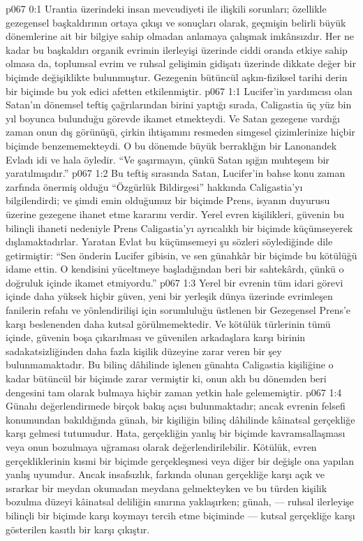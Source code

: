 \vs p067 0:1 Urantia üzerindeki insan mevcudiyeti ile ilişkili sorunları; özellikle gezegensel başkaldırının ortaya çıkışı ve sonuçları olarak, geçmişin belirli büyük dönemlerine ait bir bilgiye sahip olmadan anlamaya çalışmak imkânsızdır. Her ne kadar bu başkaldırı organik evrimin ilerleyişi üzerinde ciddi oranda etkiye sahip olmasa da, toplumsal evrim ve ruhsal gelişimin gidişatı üzerinde dikkate değer bir biçimde değişiklikte bulunmuştur. Gezegenin bütüncül aşkın\hyp{}fiziksel tarihi derin bir biçimde bu yok edici afetten etkilenmiştir.
\vs p067 1:1 Lucifer’in yardımcısı olan Satan’ın dönemsel teftiş çağrılarından birini yaptığı sırada, Caligastia üç yüz bin yıl boyunca bulunduğu görevde ikamet etmekteydi. Ve Satan gezegene vardığı zaman onun dış görünüşü, çirkin ihtişamını resmeden simgesel çizimlerinize hiçbir biçimde benzememekteydi. O bu dönemde büyük berraklığın bir Lanonandek Evladı idi ve hala öyledir. “Ve şaşırmayın, çünkü Satan ışığın muhteşem bir yaratılmışıdır.”
\vs p067 1:2 Bu teftiş sırasında Satan, Lucifer’in bahse konu zaman zarfında önermiş olduğu “Özgürlük Bildirgesi” hakkında Caligastia’yı bilgilendirdi; ve şimdi emin olduğumuz bir biçimde Prens, isyanın duyurusu üzerine gezegene ihanet etme kararını verdir. Yerel evren kişilikleri, güvenin bu bilinçli ihaneti nedeniyle Prens Caligastia’yı ayrıcalıklı bir biçimde küçümseyerek dışlamaktadırlar. Yaratan Evlat bu küçümsemeyi şu sözleri söylediğinde dile getirmiştir: “Sen önderin Lucifer gibisin, ve sen günahkâr bir biçimde bu kötülüğü idame ettin. O kendisini yüceltmeye başladığından beri bir sahtekârdı, çünkü o doğruluk içinde ikamet etmiyordu.”
\vs p067 1:3 Yerel bir evrenin tüm idari görevi içinde daha yüksek hiçbir güven, yeni bir yerleşik dünya üzerinde evrimleşen fanilerin refahı ve yönlendirilişi için sorumluluğu üstlenen bir Gezegensel Prens’e karşı beslenenden daha kutsal görülmemektedir. Ve kötülük türlerinin tümü içinde, güvenin boşa çıkarılması ve güvenilen arkadaşlara karşı birinin sadakatsizliğinden daha fazla kişilik düzeyine zarar veren bir şey bulunmamaktadır. Bu bilinç dâhilinde işlenen günahta Caligastia kişiliğine o kadar bütüncül bir biçimde zarar vermiştir ki, onun aklı bu dönemden beri dengesini tam olarak bulmaya hiçbir zaman yetkin hale gelememiştir.
\vs p067 1:4 Günahı değerlendirmede birçok bakış açısı bulunmaktadır; ancak evrenin felsefi konumundan bakıldığında günah, bir kişiliğin bilinç dâhilinde kâinatsal gerçekliğe karşı gelmesi tutumudur. Hata, gerçekliğin yanlış bir biçimde kavramsallaşması veya onun bozulmaya uğraması olarak değerlendirilebilir. Kötülük, evren gerçekliklerinin kısmi bir biçimde gerçekleşmesi veya diğer bir değişle ona yapılan yanlış uyumdur. Ancak insafsızlık, farkında olunan gerçekliğe karşı açık ve ısrarkar bir meydan okumadan meydana gelmekteyken ve bu türden kişilik bozulma düzeyi kâinatsal deliliğin sınırına yaklaşırken; günah, --- ruhsal ilerleyişe bilinçli bir biçimde karşı koymayı tercih etme biçiminde --- kutsal gerçekliğe karşı gösterilen kasıtlı bir karşı çıkıştır.
